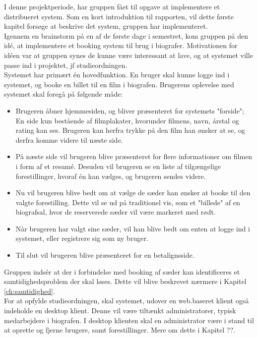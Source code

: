 I denne projektperiode, har gruppen fået til opgave at implementere et distribueret system. Som en kort introduktion til rapporten, vil dette første kapitel forsøge at beskrive det system,
gruppen har implementeret. \\

Igennem en brainstorm på en af de første dage i semestret, kom gruppen på den idé, at implementere et booking system til brug i 
biografer. Motivationen for idéen var at gruppen synes de kunne være interessant at lave, og at systemet ville passe ind i projektet, jf studieordningen. \\

Systemet har primært én hovedfunktion. En bruger skal kunne logge ind i systemet, og booke en billet til en film i biografen. Brugerens oplevelse med systemet skal foregå på følgende måde:

\begin{itemize}
    \item Brugeren åbner hjemmesiden, og bliver præsenteret for systemets "forside"; En side kun bestående af filmplakater, hvorunder filmens, navn, årstal og rating kan ses. Brugeren kan herfra trykke på den film han ønsker at se, og derfra komme videre til næste side.
    \item På næste side vil brugeren blive præsenteret for flere informationer om filmen i form af et resumé. Desuden vil brugeren se en liste af tilgængelige forestillinger, hvoraf én kan vælges, og brugeren sendes videre.
    \item Nu vil brugeren blive bedt om at vælge de sæder han ønsker at booke til den valgte forestilling. Dette vil se ud på traditionel vis, som et "billede" af en biografsal, hvor de reserverede sæder vil være markeret med rødt.
    \item Når brugeren har valgt sine sæder, vil han blive bedt om enten at logge ind i systemet, eller registrere sig som ny bruger.
    \item Til slut vil brugeren blive præsenteret for en betalignsside.
\end{itemize}

Gruppen indsér at der i forbindelse med booking af sæder kan identificeres et samtidighedsproblem der skal løses. Dette vil blive beskrevet nærmere i Kapitel \ref{ch:samtidighed}. \\

For at opfylde studieordningen, skal systemet, udover en web.baseret klient også indeholde en desktop klient. Denne vil være tiltænkt administratorer, typisk medarbejdere i biografen.
I desktop klienten skal en administrator være i stand til at oprette og fjerne brugere, samt forestillinger. Mere om dette i Kapitel ??.